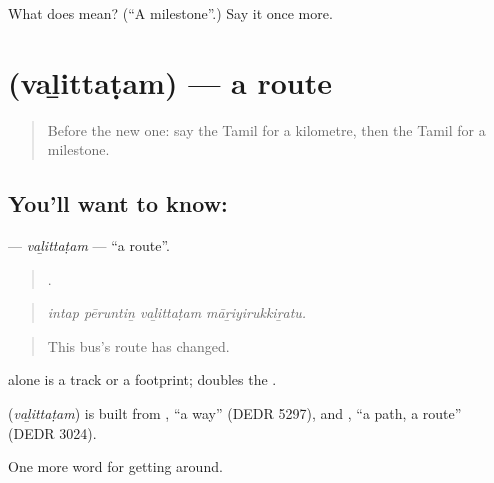 \begin{tcolorbox}[breakable,colback=teal!4,colframe=teal!35!black,title={Before you move on}]
What does  mean? (\textquotedblleft{}A milestone\textquotedblright{}.) Say it once more.
\end{tcolorbox}
\section[\texorpdfstring{\ta{வழித்தடம்} (vaḻittaṭam)}{வழித்தடம் (vaḻittaṭam)}]{ (vaḻittaṭam) — a route}

\label{lesson:TA-C407-valittatam}



\begin{quote}
Before the new one: say the Tamil for a kilometre, then the Tamil for a milestone.
\end{quote}

\subsection*{You'll want to know: }
\textbf{} — \emph{vaḻittaṭam} — \textquotedblleft{}a route\textquotedblright{}.

\begin{quote}
   .
\end{quote}

\begin{quote}
\emph{intap pēruntiṉ vaḻittaṭam māṟiyirukkiṟatu.}
\end{quote}

\begin{quote}
This bus's route has changed.
\end{quote}

 alone is a track or a footprint;  doubles the .

\begin{cousinweb}
\textbf{} (\emph{vaḻittaṭam}) is built from , \textquotedblleft{}a way\textquotedblright{} (DEDR 5297), and , \textquotedblleft{}a path, a route\textquotedblright{} (DEDR 3024).
\end{cousinweb}

\begin{grammarlens}[title={What you've built}]
One more word for getting around.
\end{grammarlens}

